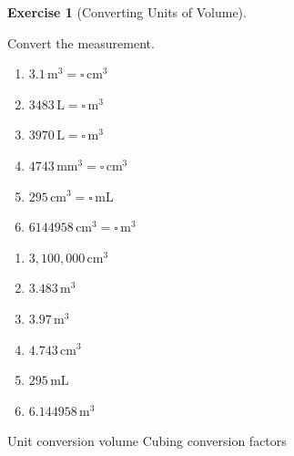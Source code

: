 \documentclass[
  letterpaper,
  DIV=11,
  numbers=noendperiod]{scrreprt}
\theoremstyle{definition}
\newtheorem{exercise}{Exercise}[chapter]
\theoremstyle{remark}
\begin{document}
\begin{exercise}[Converting Units of
Volume]\protect\hypertarget{exr-conv-3}{}\label{exr-conv-3}

Convert the measurement.

\begin{enumerate}
\def\labelenumi{\alph{enumi})}
\item
  \(3.1\,\text{m}^{3} = \square\,\text{cm}^{3}\)
\item
  \(3483\,\text{L} = \square\,\text{m}^{3}\)
\item
  \(3970\,\text{L} = \square\,\text{m}^{3}\)
\item
  \(4743\,\text{mm}^{3} = \square\,\text{cm}^{3}\)
\item
  \(295\,\text{cm}^{3} = \square\,\text{mL}\)
\item
  \(6144958\,\text{cm}^{3} = \square\,\text{m}^{3}\)
\end{enumerate}

\begin{tcolorbox}[enhanced jigsaw, opacitybacktitle=0.6, coltitle=black, arc=.35mm, colframe=quarto-callout-tip-color-frame, colback=white, bottomrule=.15mm, left=2mm, colbacktitle=quarto-callout-tip-color!10!white, titlerule=0mm, opacityback=0, title=\textcolor{quarto-callout-tip-color}{\faLightbulb}\hspace{0.5em}{🔍 View Solution}, leftrule=.75mm, breakable, rightrule=.15mm, bottomtitle=1mm, toptitle=1mm, toprule=.15mm]

\begin{enumerate}
\def\labelenumi{\alph{enumi})}
\item
  \(3{,}100{,}000\,\text{cm}^{3}\)
\item
  \(3.483\,\text{m}^{3}\)
\item
  \(3.97\,\text{m}^{3}\)
\item
  \(4.743\,\text{cm}^{3}\)
\item
  \(295\,\text{mL}\)
\item
  \(6.144958\,\text{m}^{3}\)
\end{enumerate}

\end{tcolorbox}

{Unit conversion volume} {Cubing conversion factors}

\end{exercise}
\end{document}
